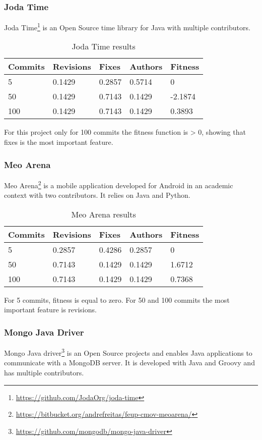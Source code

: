 \subsubsection{Joda Time}
Joda Time\footnote{\url{https://github.com/JodaOrg/joda-time}} is an Open Source time library for Java with multiple contributors.

\begin{table}[H]
    \centering
    \caption{Joda Time results}
    \label{table:learning_jodatime}
    \begin{tabular}{|l|l|l|l|l|}
        \hline
        Commits & Revisions & Fixes & Authors & Fitness \\ \hline
        5 & 0.1429 & 0.2857 & 0.5714 & 0 \\ \hline
        50 & 0.1429 & 0.7143 & 0.1429 & -2.1874 \\ \hline
        100 & 0.1429 & 0.7143 & 0.1429 & 0.3893 \\ \hline
    \end{tabular}
\end{table}
For this project only for 100 commits the fitness function is > 0, showing that fixes is the most important feature.

\subsubsection{Meo Arena}
Meo Arena\footnote{\url{https://bitbucket.org/andrefreitas/feup-cmov-meoarena/}} is a mobile application developed for Android in an academic context with two contributors. It relies on Java and Python.

\begin{table}[H]
    \centering
    \caption{Meo Arena results}
    \label{table:learning_meoarena}
    \begin{tabular}{|l|l|l|l|l|}
        \hline
        Commits & Revisions & Fixes & Authors & Fitness \\ \hline
        5 & 0.2857 & 0.4286 & 0.2857 & 0 \\ \hline
        50 & 0.7143 & 0.1429 & 0.1429 & 1.6712 \\ \hline
        100 & 0.7143 & 0.1429 & 0.1429 & 0.7368 \\ \hline
    \end{tabular}
\end{table}

For 5 commits, fitness is equal to zero. For 50 and 100 commits the most important feature is revisions.

\subsubsection{Mongo Java Driver}
Mongo Java driver\footnote{\url{https://github.com/mongodb/mongo-java-driver}} is an Open Source projects and enables Java applications to communicate with a MongoDB server. It is developed with Java and Groovy and has multiple contributors.

